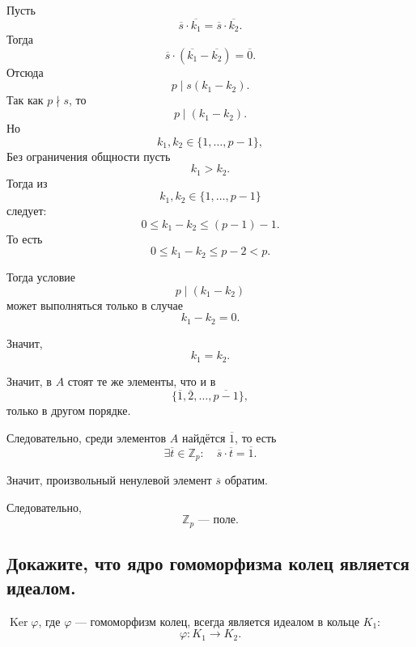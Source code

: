 \begin{Proof}
    Пусть
    \[
        \overline{s}\cdot\overline{k_1}
        =
        \overline{s}\cdot\overline{k_2}.
    \]
    Тогда
    \[
        \overline{s}\cdot(\overline{k_1}-\overline{k_2})
        =
        \overline{0}.
    \]
    Отсюда
    \[
        p\mid s(k_1-k_2).
    \]
    Так как $p\nmid s$, то
    \[
        p\mid (k_1-k_2).
    \]
    Но
    \[
        k_1,k_2\in\{1,\ldots,p-1\},
    \]
        Без ограничения общности пусть
    \[
        k_1 > k_2.
    \]
    Тогда из
    \[
        k_1,k_2 \in \{1,\ldots,p-1\}
    \]
    следует:
    \[
        0 \leq k_1-k_2 \leq (p-1)-1.
    \]
    То есть
    \[
        0 \leq k_1-k_2 \leq p-2 < p.
    \]

    Тогда условие
    \[
        p \mid (k_1-k_2)
    \]
    может выполняться только в случае
    \[
        k_1-k_2 = 0.
    \]

    Значит,
    \[
        k_1=k_2.
    \]

    Значит, в $A$ стоят те же элементы, что и в
    \[
        \{\overline{1},\overline{2},\ldots,\overline{p-1}\},
    \]
    только в другом порядке.

    Следовательно, среди элементов $A$ найдётся $\overline{1}$, то есть
    \[
        \exists \overline{t}\in \mathbb{Z}_p:
        \quad
        \overline{s}\cdot\overline{t}
        =
        \overline{1}.
    \]

    Значит, произвольный ненулевой элемент $\overline{s}$ обратим.

    Следовательно,
    \[
        \mathbb{Z}_p \text{ --- поле.}
    \]
\end{Proof}

\subsection{Докажите, что ядро гомоморфизма колец является идеалом.}
\begin{lemma}
    $\operatorname{Ker}\varphi$, где $\varphi$ --- гомоморфизм колец, всегда является идеалом в кольце $K_1$:
    \[
        \varphi: K_1 \to K_2.
    \]
\end{lemma}

